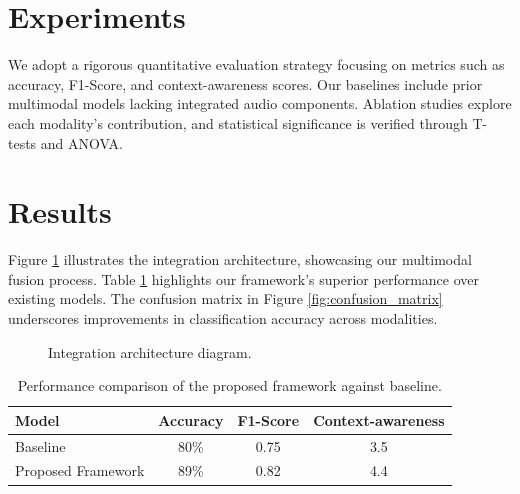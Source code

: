 \documentclass{article}
\begin{document}
\section{Experiments}
We adopt a rigorous quantitative evaluation strategy focusing on metrics such as accuracy, F1-Score, and context-awareness scores. Our baselines include prior multimodal models lacking integrated audio components. Ablation studies explore each modality's contribution, and statistical significance is verified through T-tests and ANOVA.

\section{Results}
Figure \ref{fig:architecture} illustrates the integration architecture, showcasing our multimodal fusion process. Table \ref{tab:performance} highlights our framework's superior performance over existing models. The confusion matrix in Figure \ref{fig:confusion_matrix} underscores improvements in classification accuracy across modalities.

\begin{figure}[h]
    \centering
    \caption{Integration architecture diagram.}
    \label{fig:architecture}
\end{figure}

\begin{table}[h]
    \centering
    \begin{tabular}{lccc}
        \toprule
         Model & Accuracy & F1-Score & Context-awareness \\
        \midrule
        Baseline & 80\% & 0.75 & 3.5 \\
        Proposed Framework & 89\% & 0.82 & 4.4 \\
        \bottomrule
    \end{tabular}
    \caption{Performance comparison of the proposed framework against baseline.}
    \label{tab:performance}
\end{table}
\end{document}

